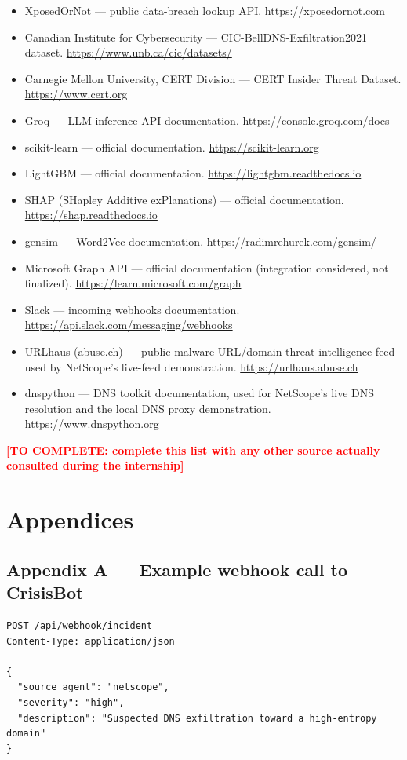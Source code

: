 \documentclass[12pt,a4paper]{report}
\newcommand{\TODO}[1]{\textcolor{red}{\textbf{[TO COMPLETE: #1]}}}
\begin{document}
\begin{itemize}[nosep]
\item XposedOrNot --- public data-breach lookup API. \url{https://xposedornot.com}
\item Canadian Institute for Cybersecurity --- CIC-BellDNS-Exfiltration2021 dataset. \url{https://www.unb.ca/cic/datasets/}
\item Carnegie Mellon University, CERT Division --- CERT Insider Threat Dataset. \url{https://www.cert.org}
\item Groq --- LLM inference API documentation. \url{https://console.groq.com/docs}
\item scikit-learn --- official documentation. \url{https://scikit-learn.org}
\item LightGBM --- official documentation. \url{https://lightgbm.readthedocs.io}
\item SHAP (SHapley Additive exPlanations) --- official documentation. \url{https://shap.readthedocs.io}
\item gensim --- Word2Vec documentation. \url{https://radimrehurek.com/gensim/}
\item Microsoft Graph API --- official documentation (integration considered, not finalized). \url{https://learn.microsoft.com/graph}
\item Slack --- incoming webhooks documentation. \url{https://api.slack.com/messaging/webhooks}
\item URLhaus (abuse.ch) --- public malware-URL/domain threat-intelligence feed used by NetScope's live-feed demonstration. \url{https://urlhaus.abuse.ch}
\item dnspython --- DNS toolkit documentation, used for NetScope's live DNS resolution and the local DNS proxy demonstration. \url{https://www.dnspython.org}
\end{itemize}

\TODO{complete this list with any other source actually consulted during the internship}

\appendix
\chapter*{Appendices}

\section*{Appendix A --- Example webhook call to CrisisBot}
\begingroup\small
\begin{verbatim}
POST /api/webhook/incident
Content-Type: application/json

{
  "source_agent": "netscope",
  "severity": "high",
  "description": "Suspected DNS exfiltration toward a high-entropy domain"
}
\end{verbatim}
\endgroup
\end{document}
